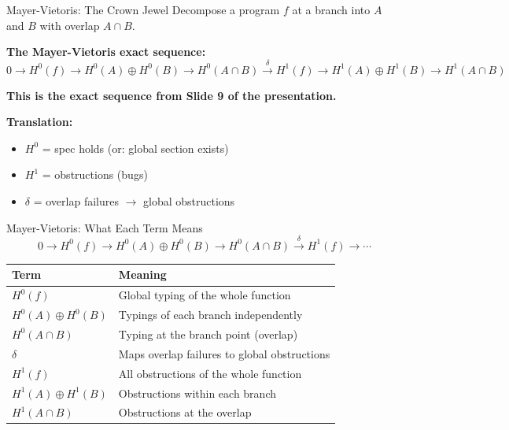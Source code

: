 \documentclass[aspectratio=169,10pt]{beamer}
\begin{document}
\begin{frame}{Mayer-Vietoris: The Crown Jewel}
Decompose a program $f$ at a branch into $A$ and $B$ with overlap $A \cap B$.

\textbf{The Mayer-Vietoris exact sequence:}
{\small
\[
0 \!\to\! H^0(f) \!\to\! H^0(A) \!\oplus\! H^0(B) \!\to\! H^0(A\!\cap\! B)
\xrightarrow{\;\delta\;}
H^1(f) \!\to\! H^1(A) \!\oplus\! H^1(B) \!\to\! H^1(A\!\cap\! B)
\]}

\textbf{This is the exact sequence from Slide 9 of the presentation.}

\vspace{0.3em}
\textbf{Translation:}
\begin{itemize}
  \item $H^0$ = spec holds (or: global section exists)
  \item $H^1$ = obstructions (bugs)
  \item $\delta$ = overlap failures $\to$ global obstructions
\end{itemize}
\end{frame}

\begin{frame}{Mayer-Vietoris: What Each Term Means}
\[
0 \to H^0(f) \to H^0(A) \oplus H^0(B) \to H^0(A \cap B) \xrightarrow{\delta} H^1(f) \to \cdots
\]

\renewcommand{\arraystretch}{1.4}
\begin{tabular}{@{}lp{8cm}@{}}
\toprule
\textbf{Term} & \textbf{Meaning} \\
\midrule
$H^0(f)$ & Global typing of the whole function \\
$H^0(A) \oplus H^0(B)$ & Typings of each branch independently \\
$H^0(A \cap B)$ & Typing at the branch point (overlap) \\
$\delta$ & Maps overlap failures to global obstructions \\
$H^1(f)$ & All obstructions of the whole function \\
$H^1(A) \oplus H^1(B)$ & Obstructions within each branch \\
$H^1(A \cap B)$ & Obstructions at the overlap \\
\bottomrule
\end{tabular}
\end{frame}
\end{document}
